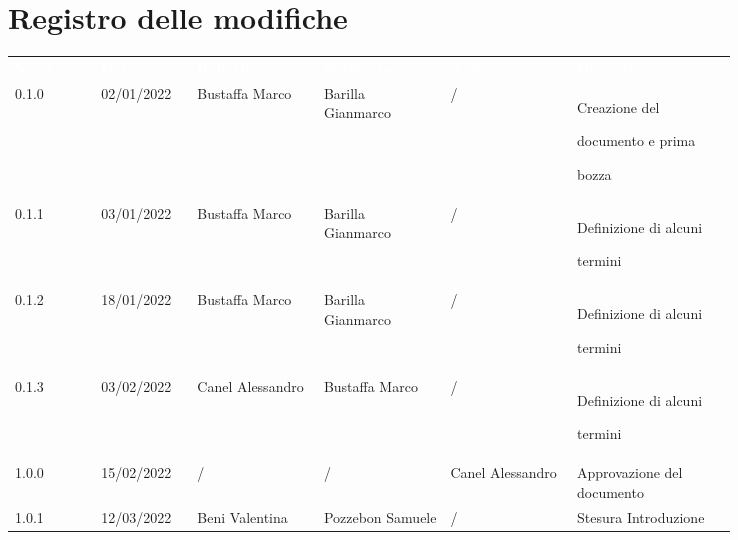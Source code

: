 \section*{Registro delle modifiche}

{\renewcommand{\arraystretch}{1.5}
\scriptsize
\begin{tabular}{p{0.10\linewidth}p{0.10\linewidth}p{0.15\linewidth}p{0.15\linewidth}p{0.15\linewidth}p{0.19\linewidth}}
	\rowcolor[RGB]{33, 73, 50}
	\textcolor{white}{\textbf{Versione}} & \textcolor{white}{\textbf{Data}} &
	\textcolor{white}{\textbf{Redattore}} & \textcolor{white}{\textbf{Verificatore}} &
	\textcolor{white}{\textbf{Approvatore}} & \textcolor{white}{\textbf{Descrizione}}\\
	\rowcolor[RGB]{216, 235, 171}
	0.1.0 & 02/01/2022 & Bustaffa Marco & Barilla Gianmarco &/& Creazione del \par documento  e prima \par bozza\\
	\rowcolor[RGB]{233, 245, 206}
	0.1.1 & 03/01/2022 & Bustaffa Marco & Barilla Gianmarco &/& Definizione di alcuni \par termini\\
	\rowcolor[RGB]{216, 235, 171}
	0.1.2 & 18/01/2022 & Bustaffa Marco & Barilla Gianmarco &/& Definizione di alcuni \par termini\\
	\rowcolor[RGB]{233, 245, 206}
	0.1.3 & 03/02/2022 & Canel Alessandro & Bustaffa Marco &/& Definizione di alcuni \par termini\\
	\rowcolor[RGB]{216, 235, 171}
	1.0.0 & 15/02/2022 & / & / & Canel Alessandro& Approvazione del documento\\
	\rowcolor[RGB]{233, 245, 206}
	1.0.1 & 12/03/2022 & Beni Valentina & Pozzebon Samuele & / & Stesura Introduzione\\

\end{tabular}
}
